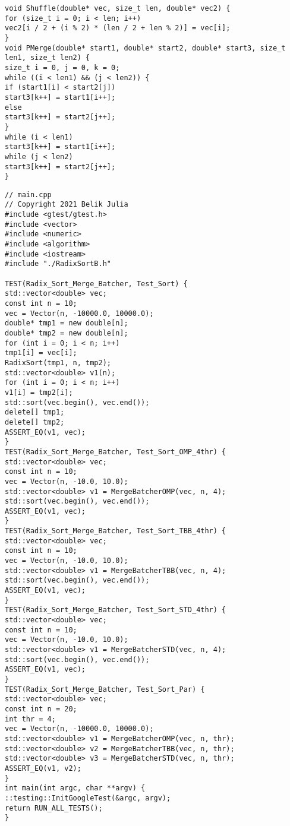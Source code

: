 \documentclass{report}
\begin{document}
\begin{lstlisting}
void Shuffle(double* vec, size_t len, double* vec2) {
for (size_t i = 0; i < len; i++)
vec2[i / 2 + (i % 2) * (len / 2 + len % 2)] = vec[i];
}
void PMerge(double* start1, double* start2, double* start3, size_t len1, size_t len2) {
size_t i = 0, j = 0, k = 0;
while ((i < len1) && (j < len2)) {
if (start1[i] < start2[j])
start3[k++] = start1[i++];
else
start3[k++] = start2[j++];
}
while (i < len1)
start3[k++] = start1[i++];
while (j < len2)
start3[k++] = start2[j++];
}
\end{lstlisting}
\begin{lstlisting}
// main.cpp
// Copyright 2021 Belik Julia
#include <gtest/gtest.h>
#include <vector>
#include <numeric>
#include <algorithm>
#include <iostream>
#include "./RadixSortB.h"

TEST(Radix_Sort_Merge_Batcher, Test_Sort) {
std::vector<double> vec;
const int n = 10;
vec = Vector(n, -10000.0, 10000.0);
double* tmp1 = new double[n];
double* tmp2 = new double[n];
for (int i = 0; i < n; i++)
tmp1[i] = vec[i];
RadixSort(tmp1, n, tmp2);
std::vector<double> v1(n);
for (int i = 0; i < n; i++)
v1[i] = tmp2[i];
std::sort(vec.begin(), vec.end());
delete[] tmp1;
delete[] tmp2;
ASSERT_EQ(v1, vec);
}
TEST(Radix_Sort_Merge_Batcher, Test_Sort_OMP_4thr) {
std::vector<double> vec;
const int n = 10;
vec = Vector(n, -10.0, 10.0);
std::vector<double> v1 = MergeBatcherOMP(vec, n, 4);
std::sort(vec.begin(), vec.end());
ASSERT_EQ(v1, vec);
}
TEST(Radix_Sort_Merge_Batcher, Test_Sort_TBB_4thr) {
std::vector<double> vec;
const int n = 10;
vec = Vector(n, -10.0, 10.0);
std::vector<double> v1 = MergeBatcherTBB(vec, n, 4);
std::sort(vec.begin(), vec.end());
ASSERT_EQ(v1, vec);
}
TEST(Radix_Sort_Merge_Batcher, Test_Sort_STD_4thr) {
std::vector<double> vec;
const int n = 10;
vec = Vector(n, -10.0, 10.0);
std::vector<double> v1 = MergeBatcherSTD(vec, n, 4);
std::sort(vec.begin(), vec.end());
ASSERT_EQ(v1, vec);
}
TEST(Radix_Sort_Merge_Batcher, Test_Sort_Par) {
std::vector<double> vec;
const int n = 20;
int thr = 4;
vec = Vector(n, -10000.0, 10000.0);
std::vector<double> v1 = MergeBatcherOMP(vec, n, thr);
std::vector<double> v2 = MergeBatcherTBB(vec, n, thr);
std::vector<double> v3 = MergeBatcherSTD(vec, n, thr);
ASSERT_EQ(v1, v2);
}
int main(int argc, char **argv) {
::testing::InitGoogleTest(&argc, argv);
return RUN_ALL_TESTS();
}
\end{lstlisting}
\end{document}
